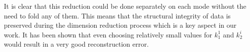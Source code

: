 \documentclass[preprint,12pt]{elsarticle}
\begin{document}
	It is clear that this reduction could be done separately on each mode without the need to fold any of them. This means that the structural integrity of data is preserved during the dimension reduction process which is a key aspect in our work. It has been shown that even choosing relatively small values for $k_1^1$ and $k_2^i$ would result in a very good reconstruction error\cite{r60}.
	
\end{document}
